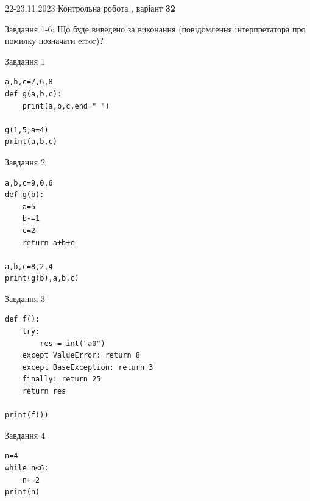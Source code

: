 \documentclass[12pt, ukrainian]{article}
\begin{document}
{{22-23.11.2023 Контрольна робота , варіант  \No \textbf { 32 }\par}}
{

Завдання 1-6: Що буде виведено за виконання (повідомлення інтерпретатора про помилку позначати error)?


\begin{minipage}[t]{9.7cm}                
{\begin{center}Завдання {1}\end{center}}
\begin{verbatim}
a,b,c=7,6,8
def g(a,b,c):
    print(a,b,c,end=" ")

g(1,5,a=4)
print(a,b,c)
\end{verbatim}     
\end{minipage}
\vline \hspace{8mm}
\begin{minipage}[t]{8.0cm}                
{\begin{center}Завдання {2}\end{center}}
\begin{verbatim}
a,b,c=9,0,6
def g(b):
    a=5
    b-=1
    c=2
    return a+b+c

a,b,c=8,2,4
print(g(b),a,b,c)
\end{verbatim}     
\end{minipage}

\vspace{15mm}
\begin{minipage}[t]{9.7cm}                
{\begin{center}Завдання {3}\end{center}}
\begin{verbatim}
def f():
    try:
        res = int("a0")
    except ValueError: return 8
    except BaseException: return 3
    finally: return 25
    return res

print(f())
\end{verbatim}     
\end{minipage}
\vline \hspace{8mm}
\begin{minipage}[t]{8.0cm}                
{\begin{center}Завдання {4}\end{center}}
\begin{verbatim}
n=4
while n<6:
    n+=2
print(n)
\end{verbatim}     
\end{minipage}

}
\end{document}
